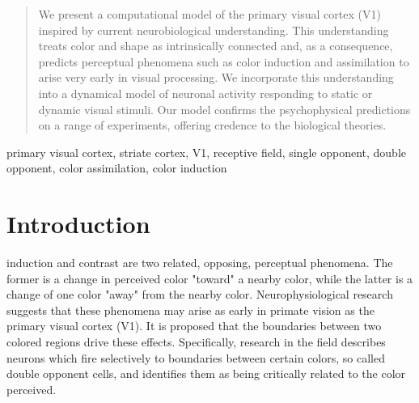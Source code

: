\documentclass[journal,onecolumn]{IEEEtran}
\begin{document}
\begin{abstract}
We present a computational model of the primary visual cortex (V1) inspired by current neurobiological understanding. This understanding treats color and shape as intrinsically connected and, as a consequence, predicts perceptual phenomena such as color induction and assimilation to arise very early in visual processing. We incorporate this understanding into a dynamical model of neuronal activity responding to static or dynamic visual stimuli. Our model confirms the psychophysical predictions on a range of experiments, offering credence to the biological theories.
\end{abstract}

\begin{IEEEkeywords}
primary visual cortex, striate cortex, V1, receptive field, single opponent, double opponent, color assimilation, color induction
\end{IEEEkeywords}


%
\IEEEpeerreviewmaketitle



\section{Introduction}


 induction and contrast are two related, opposing, perceptual phenomena. The former is a change in perceived color "toward" a nearby color, while the latter is a change of one color "away" from the nearby color. Neurophysiological research suggests that these phenomena may arise as early in primate vision as the primary visual cortex (V1). It is proposed that the boundaries between two colored regions drive these effects. Specifically, research in the field describes neurons which fire selectively to boundaries between certain colors, so called double opponent cells, and identifies them as being critically related to the color perceived.
\end{document}
